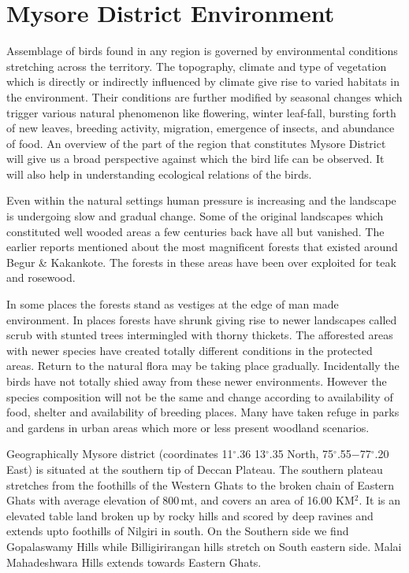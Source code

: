 \chapter{Mysore District Environment}

Assemblage of birds found in any region is governed by 
environmental conditions stretching across the territory. The 
topography, climate and type of vegetation which is directly or 
indirectly influenced by climate give rise to varied habitats in 
the environment. Their conditions are further modified by seasonal 
changes which trigger various natural phenomenon like flowering, 
winter leaf-fall, bursting forth of new leaves, breeding 
activity, migration, emergence of insects, and abundance of 
food. An overview of the part of the region that constitutes 
Mysore District will give us a broad perspective against which 
the bird life can be observed. It will also help in understanding 
ecological relations of the birds. 

Even within the natural settings human pressure is increasing 
and the landscape is undergoing slow and gradual change. Some 
of the original landscapes which constituted well wooded areas a 
few centuries back have all but vanished. The earlier reports 
mentioned about the most magnificent forests that existed around 
Begur \& Kakankote. The forests in these areas have been over exploited 
for teak and rosewood. 

In some places the forests stand as vestiges at the edge of 
man made environment. In places forests have shrunk giving rise 
to newer landscapes called scrub with stunted trees intermingled 
with thorny thickets. The afforested areas with newer species 
have created totally different conditions in the protected areas. 
Return to the natural flora may be taking place gradually. Incidentally 
the birds have not totally shied away from these newer 
environments. However the species composition will not be the 
same and change according to availability of food, shelter and 
availability of breeding places. Many have taken refuge in parks 
and gardens in urban areas which more or less present woodland 
scenarios. 

Geographically Mysore district (coordinates 11$^\circ$.36 13$^\circ$.35 
North, 75$^\circ$.55$-$77$^\circ$.20 East) is situated at the southern tip of 
Deccan Plateau. The southern plateau stretches from the foothills 
of the Western Ghats to the broken chain of Eastern Ghats with 
average elevation of 800\,mt, and covers an area of 16.00 KM$^2$. It 
is an elevated table land broken up by rocky hills and scored by 
deep ravines and extends upto foothills of Nilgiri in south. On 
the Southern side we find Gopalaswamy Hills while Billigirirangan 
hills stretch on South eastern side. Malai Mahadeshwara Hills 
extends towards Eastern Ghats. 

